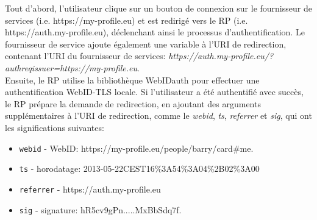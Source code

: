 Tout d'abord, l'utilisateur clique sur un bouton de connexion sur le fournisseur de services (i.e. https://my-profile.eu) et est redirigé vers le RP (i.e. https://auth.my-profile.eu), déclenchant ainsi le processus d'authentification. Le fournisseur de service ajoute également une variable à l'URI de redirection, contenant l'URI du fournisseur de services: \textit{https://auth.my-profile.eu/?authreqissuer=https://my-profile.eu}.\\


Ensuite, le RP utilise la bibliothèque WebIDauth pour effectuer une authentification WebID-TLS locale. Si l'utilisateur a été authentifié avec succès, le RP prépare la demande de redirection, en ajoutant des arguments supplémentaires à l'URI de redirection, comme le \textit{webid}, \textit{ts}, \textit{referrer} et \textit{sig}, qui ont les significations suivantes:

\begin{itemize}
\item \verb+webid+ - WebID: https://my-profile.eu/people/barry/card\#me.
\item \verb+ts+ - horodatage: 2013-05-22CEST16\%3A54\%3A04\%2B02\%3A00
\item \verb+referrer+ - https://auth.my-profile.eu
\item \verb+sig+ - signature: hR5cv9gPn.....MxBbSdq7f.
\end{itemize}

